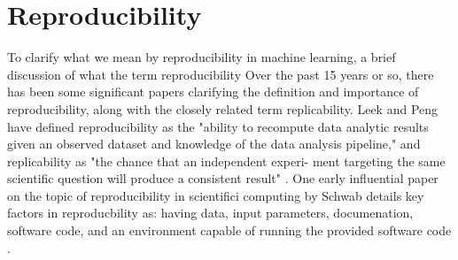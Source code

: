  \section{Reproducibility}
 To clarify what we mean by reproducibility in machine learning, a brief discussion of what the term reproducibility
 Over the past 15 years or so, there has been some significant papers clarifying the definition and importance of reproducibility, along with the closely related term replicability. Leek and Peng have defined reproducibility as the "ability to recompute data analytic results given an observed dataset and knowledge of the data analysis pipeline," and replicability as "the chance that an independent experi- ment targeting the same scientific question will produce a consistent result" \cite{leek_opinion_2015}. One early influential paper on the topic of reproducibility in scientifici computing by Schwab details key factors in reproducbility as: having data, input parameters, documenation, software code, and an environment capable of running the provided software code \cite{schwab_making_2000}.
 
 